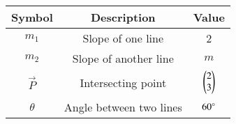 \begin{tabular}{|c|c|c|}
    \hline
        \textbf{Symbol} &\textbf{Description}&\textbf{Value}  \\
        \hline
         $m_1$&Slope of one line &2\\
         \hline
         $m_2$&Slope of another line&$m$\\
         \hline
         $\vec{P}$&Intersecting point&$\begin{pmatrix}
             2\\3
         \end{pmatrix}$\\
         \hline
         $\theta$&Angle between two lines&$60\degree$\\
         \hline
    \end{tabular}

